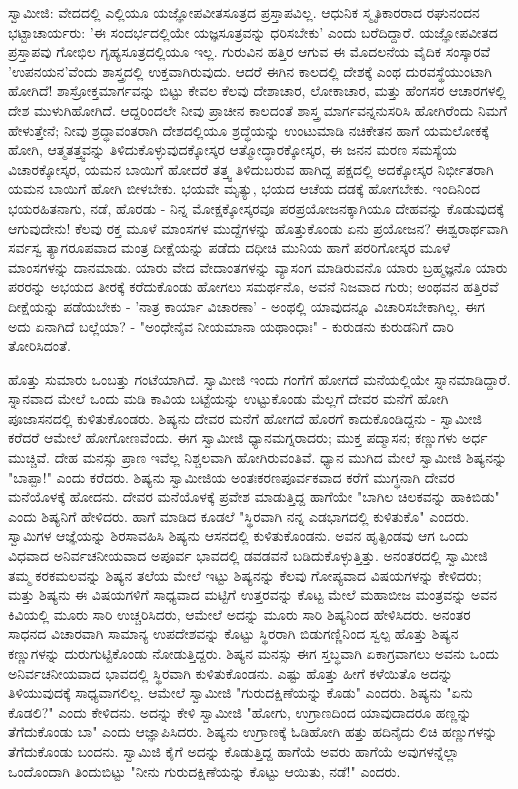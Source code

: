 ಸ್ವಾಮೀಜಿ: ವೇದದಲ್ಲಿ ಎಲ್ಲಿಯೂ ಯಜ್ಞೋಪವೀತಸೂತ್ರದ ಪ್ರಸ್ತಾಪವಿಲ್ಲ. ಆಧುನಿಕ ಸ್ಮೃತಿಕಾರರಾದ ರಘುನಂದನ ಭಟ್ಟಾಚಾರ್ಯರು: 'ಈ ಸಂದರ್ಭದಲ್ಲಿಯೇ ಯಜ್ಞಸೂತ್ರವನ್ನು ಧರಿಸಬೇಕು' ಎಂದು ಬರೆದಿದ್ದಾರೆ. ಯಜ್ಞೋಪವೀತದ ಪ್ರಸ್ತಾಪವು ಗೋಭಿಲ ಗೃಹ್ಯಸೂತ್ರದಲ್ಲಿಯೂ ಇಲ್ಲ. ಗುರುವಿನ ಹತ್ತಿರ ಆಗುವ ಈ ಮೊದಲನೆಯ ವೈದಿಕ ಸಂಸ್ಕಾರವೆ 'ಉಪನಯನ'ವೆಂದು ಶಾಸ್ತ್ರದಲ್ಲಿ ಉಕ್ತವಾಗಿರುವುದು. ಆದರೆ ಈಗಿನ ಕಾಲದಲ್ಲಿ ದೇಶಕ್ಕೆ ಎಂಥ ದುರವಸ್ಥೆಯುಂಟಾಗಿ ಹೋಗಿದೆ! ಶಾಸ್ರೋಕ್ತಮಾರ್ಗವನ್ನು ಬಿಟ್ಟು ಕೇವಲ ಕೆಲವು ದೇಶಾಚಾರ, ಲೋಕಾಚಾರ, ಮತ್ತು ಹೆಂಗಸರ ಆಚಾರಗಳಲ್ಲಿ ದೇಶ ಮುಳುಗಿಹೋಗಿದೆ. ಆದ್ದರಿಂದಲೇ ನೀವು ಪ್ರಾಚೀನ ಕಾಲದಂತೆ ಶಾಸ್ತ್ರ ಮಾರ್ಗವನ್ನನುಸರಿಸಿ ಹೋಗಿರೆಂದು ನಿಮಗೆ ಹೇಳುತ್ತೇನೆ; ನೀವು ಶ್ರದ್ಧಾವಂತರಾಗಿ ದೇಶದಲ್ಲಿಯೂ ಶ್ರದ್ಧೆಯನ್ನು ಉಂಟುಮಾಡಿ ನಚಿಕೇತನ ಹಾಗೆ ಯಮಲೋಕಕ್ಕೆ ಹೋಗಿ, ಆತ್ಮತತ್ತ್ವವನ್ನು ತಿಳಿದುಕೊಳ್ಳುವುದಕ್ಕೋಸ್ಕರ ಆತ್ಮೋದ್ಧಾರಕ್ಕೋಸ್ಕರ, ಈ ಜನನ ಮರಣ ಸಮಸ್ಯೆಯ ವಿಚಾರಕ್ಕೋಸ್ಕರ, ಯಮನ ಬಾಯಿಗೆ ಹೋದರೆ ತತ್ತ್ವ ತಿಳಿದುಬರುವ ಹಾಗಿದ್ದ ಪಕ್ಷದಲ್ಲಿ ಅದಕ್ಕೋಸ್ಕರ ನಿರ್ಭೀತರಾಗಿ ಯಮನ ಬಾಯಿಗೆ ಹೋಗಿ ಬೀಳಬೇಕು. ಭಯವೇ ಮೃತ್ಯು, ಭಯದ ಆಚೆಯ ದಡಕ್ಕೆ ಹೋಗಬೇಕು. ಇಂದಿನಿಂದ ಭಯರಹಿತನಾಗು, ನಡೆ, ಹೊರಡು - ನಿನ್ನ ಮೋಕ್ಷಕ್ಕೋಸ್ಕರವೂ ಪರಪ್ರಯೋಜನಕ್ಕಾಗಿಯೂ ದೇಹವನ್ನು ಕೊಡುವುದಕ್ಕೆ ಆಗುವುದೇನು! ಕೆಲವು ರಕ್ತ ಮೂಳೆ ಮಾಂಸಗಳ ಮುದ್ದೆಗಳನ್ನು ಹೊತ್ತುಕೊಂಡು ಏನು ಪ್ರಯೋಜನ? ಈಶ್ವರಾರ್ಥವಾಗಿ ಸರ್ವಸ್ವ ತ್ಯಾಗರೂಪವಾದ ಮಂತ್ರ ದೀಕ್ಷೆಯನ್ನು ಪಡೆದು ದಧೀಚಿ ಮುನಿಯ ಹಾಗೆ ಪರರಿಗೋಸ್ಕರ ಮೂಳೆ ಮಾಂಸಗಳನ್ನು ದಾನಮಾಡು. ಯಾರು ವೇದ ವೇದಾಂತಗಳನ್ನು ವ್ಯಾಸಂಗ ಮಾಡಿರುವನೊ ಯಾರು ಬ್ರಹ್ಮಜ್ಞನೊ ಯಾರು ಪರರನ್ನು ಅಭಯದ ತೀರಕ್ಕೆ ಕರೆದುಕೊಂಡು ಹೋಗಲು ಸಮರ್ಥನೊ, ಅವನೆ ನಿಜವಾದ ಗುರು; ಅಂಥವನ ಹತ್ತಿರವೆ ದೀಕ್ಷೆಯನ್ನು ಪಡೆಯಬೇಕು - 'ನಾತ್ರ ಕಾರ್ಯಾ ವಿಚಾರಣಾ' - ಅಂಥಲ್ಲಿ ಯಾವುದನ್ನೂ ವಿಚಾರಿಸಬೇಕಾಗಿಲ್ಲ. ಈಗ ಅದು ಏನಾಗಿದೆ ಬಲ್ಲೆಯಾ? - "ಅಂಧೇನೈವ ನೀಯಮಾನಾ ಯಥಾಂಧಾಃ" - ಕುರುಡನು ಕುರುಡನಿಗೆ ದಾರಿ ತೋರಿಸಿದಂತೆ.

ಹೊತ್ತು ಸುಮಾರು ಒಂಬತ್ತು ಗಂಟೆಯಾಗಿದೆ. ಸ್ವಾಮೀಜಿ ಇಂದು ಗಂಗೆಗೆ ಹೋಗದೆ ಮನೆಯಲ್ಲಿಯೇ ಸ್ನಾನಮಾಡಿದ್ದಾರೆ. ಸ್ನಾನವಾದ ಮೇಲೆ ಒಂದು ಮಡಿ ಕಾವಿಯ ಬಟ್ಟೆಯನ್ನು ಉಟ್ಟುಕೊಂಡು ಮೆಲ್ಲಗೆ ದೇವರ ಮನೆಗೆ ಹೋಗಿ ಪೂಜಾಸನದಲ್ಲಿ ಕುಳಿತುಕೊಂಡರು. ಶಿಷ್ಯನು ದೇವರ ಮನೆಗೆ ಹೋಗದೆ ಹೊರಗೆ ಕಾದುಕೊಂಡಿದ್ದನು - ಸ್ವಾಮೀಜಿ ಕರೆದರೆ ಆಮೇಲೆ ಹೋಗೋಣವೆಂದು. ಈಗ ಸ್ವಾಮೀಜಿ ಧ್ಯಾನಮಗ್ನರಾದರು; ಮುಕ್ತ ಪದ್ಮಾಸನ; ಕಣ್ಣುಗಳು ಅರ್ಧ ಮುಚ್ಚಿವೆ. ದೇಹ ಮನಸ್ಸು ಪ್ರಾಣ ಇವೆಲ್ಲ ನಿಶ್ಚಲವಾಗಿ ಹೋಗಿರುವಂತಿವೆ. ಧ್ಯಾನ ಮುಗಿದ ಮೇಲೆ ಸ್ವಾಮೀಜಿ ಶಿಷ್ಯನನ್ನು "ಬಾಪ್ಪಾ!" ಎಂದು ಕರೆದರು. ಶಿಷ್ಯನು ಸ್ವಾಮೀಜಿಯ ಅಂತಃಕರಣಪೂರ್ವಕವಾದ ಕರೆಗೆ ಮುಗ್ಧನಾಗಿ ದೇವರ ಮನೆಯೊಳಕ್ಕೆ ಹೋದನು. ದೇವರ ಮನೆಯೊಳಕ್ಕೆ ಪ್ರವೇಶ ಮಾಡುತ್ತಿದ್ದ ಹಾಗೆಯೇ "ಬಾಗಿಲ ಚಿಲಕವನ್ನು ಹಾಕಿಬಿಡು" ಎಂದು ಶಿಷ್ಯನಿಗೆ ಹೇಳಿದರು. ಹಾಗೆ ಮಾಡಿದ ಕೂಡಲೆ "ಸ್ಥಿರವಾಗಿ ನನ್ನ ಎಡಭಾಗದಲ್ಲಿ ಕುಳಿತುಕೊ" ಎಂದರು. ಸ್ವಾಮಿಗಳ ಆಜ್ಞೆಯನ್ನು ಶಿರಸಾವಹಿಸಿ ಶಿಷ್ಯನು ಆಸನದಲ್ಲಿ ಕುಳಿತುಕೊಂಡನು. ಅವನ ಹೃತ್ಪಿಂಡವು ಆಗ ಒಂದು ವಿಧವಾದ ಅನಿರ್ವಚನೀಯವಾದ ಅಪೂರ್ವ ಭಾವದಲ್ಲಿ ಡವಡವನೆ ಬಡಿದುಕೊಳ್ಳುತ್ತಿತ್ತು. ಅನಂತರದಲ್ಲಿ ಸ್ವಾಮೀಜಿ ತಮ್ಮ ಕರಕಮಲವನ್ನು ಶಿಷ್ಯನ ತಲೆಯ ಮೇಲೆ ಇಟ್ಟು ಶಿಷ್ಯನನ್ನು ಕೆಲವು ಗೋಪ್ಯವಾದ ವಿಷಯಗಳನ್ನು ಕೇಳಿದರು; ಮತ್ತು ಶಿಷ್ಯನು ಈ ವಿಷಯಗಳಿಗೆ ಸಾಧ್ಯವಾದ ಮಟ್ಟಿಗೆ ಉತ್ತರವನ್ನು ಕೊಟ್ಟ ಮೇಲೆ ಮಹಾಬೀಜ ಮಂತ್ರವನ್ನು ಅವನ ಕಿವಿಯಲ್ಲಿ ಮೂರು ಸಾರಿ ಉಚ್ಚರಿಸಿದರು, ಆಮೇಲೆ ಅದನ್ನು ಮೂರು ಸಾರಿ ಶಿಷ್ಯನಿಂದ ಹೇಳಿಸಿದರು. ಅನಂತರ ಸಾಧನದ ವಿಚಾರವಾಗಿ ಸಾಮಾನ್ಯ ಉಪದೇಶವನ್ನು ಕೊಟ್ಟು ಸ್ಥಿರರಾಗಿ ಬಿಡುಗಣ್ಣಿನಿಂದ ಸ್ವಲ್ಪ ಹೊತ್ತು ಶಿಷ್ಯನ ಕಣ್ಣುಗಳನ್ನು ದುರುಗುಟ್ಟಿಕೊಂಡು ನೋಡುತ್ತಿದ್ದರು. ಶಿಷ್ಯನ ಮನಸ್ಸು ಈಗ ಸ್ತಬ್ಧವಾಗಿ ಏಕಾಗ್ರವಾಗಲು ಅವನು ಒಂದು ಅನಿರ್ವಚನೀಯವಾದ ಭಾವದಲ್ಲಿ ಸ್ಥಿರವಾಗಿ ಕುಳಿತುಕೊಂಡನು. ಎಷ್ಟು ಹೊತ್ತು ಹೀಗೆ ಕಳೆಯಿತೊ ಅದನ್ನು ತಿಳಿಯುವುದಕ್ಕೆ ಸಾಧ್ಯವಾಗಲಿಲ್ಲ. ಆಮೇಲೆ ಸ್ವಾಮೀಜಿ "ಗುರುದಕ್ಷಿಣೆಯನ್ನು ಕೊಡು" ಎಂದರು. ಶಿಷ್ಯನು "ಏನು ಕೊಡಲಿ?" ಎಂದು ಕೇಳಿದನು. ಅದನ್ನು ಕೇಳಿ ಸ್ವಾಮೀಜಿ "ಹೋಗು, ಉಗ್ರಾಣದಿಂದ ಯಾವುದಾದರೂ ಹಣ್ಣನ್ನು ತೆಗೆದುಕೊಂಡು ಬಾ" ಎಂದು ಆಜ್ಞಾಪಿಸಿದರು. ಶಿಷ್ಯನು ಉಗ್ರಾಣಕ್ಕೆ ಓಡಿಹೋಗಿ ಹತ್ತು ಹದಿನೈದು ಲಿಚಿ ಹಣ್ಣುಗಳನ್ನು ತೆಗೆದುಕೊಂಡು ಬಂದನು. ಸ್ವಾಮಿಜಿ ಕೈಗೆ ಅದನ್ನು ಕೊಡುತ್ತಿದ್ದ ಹಾಗೆಯೆ ಅವರು ಹಾಗೆಯೆ ಅವುಗಳನ್ನೆಲ್ಲಾ ಒಂದೊಂದಾಗಿ ತಿಂದುಬಿಟ್ಟು "ನೀನು ಗುರುದಕ್ಷಿಣೆಯನ್ನು ಕೊಟ್ಟು ಆಯಿತು, ನಡೆ!" ಎಂದರು.

